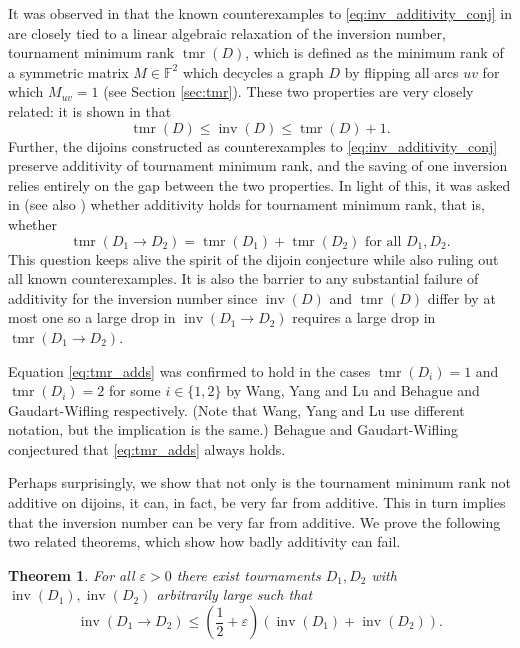 \documentclass[10pt,a4paper]{amsart}
\numberwithin{equation}{section}
\theoremstyle{plain}
\newtheorem{thm}{Theorem}[section]
\theoremstyle{remark}
\theoremstyle{definition}
\newcommand{\lb}{\left(}
\newcommand{\rb}{\right)}
\renewcommand{\epsilon}{\varepsilon}
\newcommand{\e}{\epsilon}
\newcommand{\tmr}{\operatorname{tmr}}
\newcommand{\inv}{\operatorname{inv}}
\begin{document}
It was observed in \cite{Natnote} that the known counterexamples to \eqref{eq:inv_additivity_conj} in \cite{Alon,Problems} are closely tied to a linear algebraic relaxation of the inversion number, tournament minimum rank $\tmr(D)$, which is defined as the minimum rank of a symmetric matrix $M \in \mathbb{F}^2$ which decycles a graph $D$ by flipping all arcs $uv$ for which $M_{uv} = 1$ (see Section \ref{sec:tmr}). These two properties are very closely related: it is shown in \cite{Natnote} that
\begin{equation}
    \tmr(D) \leq \inv(D) \leq \tmr(D) + 1.  \label{rel}
\end{equation}
Further, the dijoins constructed as counterexamples to \eqref{eq:inv_additivity_conj}  preserve additivity of tournament minimum rank, and the saving of one inversion relies entirely on the gap between the two properties. In light of this, it was asked in \cite[Question 17]{Natnote} (see also \cite[Problem 30.2]{BCC}) whether additivity holds for tournament minimum rank, that is, whether
\begin{equation}
    \tmr(D_1 \to D_2) = \tmr(D_1) + \tmr(D_2) \text{ for all }D_1,D_2. \label{eq:tmr_adds}
\end{equation}
 This question keeps alive the spirit of the dijoin conjecture while also ruling out all known counterexamples. It is also the barrier to any substantial failure of additivity for the inversion number since $\inv(D)$ and $\tmr(D)$ differ by at most one so a large drop in $\inv(D_1 \to D_2)$ requires a large drop in $\tmr(D_1 \to D_2)$.
 
Equation \eqref{eq:tmr_adds} was confirmed to hold in the cases $\tmr(D_i) = 1$ and  $\tmr(D_i) = 2$  for some $i \in \{1,2\}$ by Wang, Yang and Lu \cite{Wang} and Behague and Gaudart-Wifling \cite{natcase} respectively. (Note that Wang, Yang and Lu \cite{Wang}  use different notation, but the implication is the same.) 
Behague and Gaudart-Wifling \cite[Conjecture 6.1]{natcase} conjectured that \eqref{eq:tmr_adds} always holds.

Perhaps surprisingly, we show that not only is the tournament minimum rank not additive on dijoins, it can, in fact, be very far from additive. This in turn implies that the inversion number can be very far from additive. We prove the following two related theorems, which show how badly additivity can fail.

\begin{thm} \label{T1}
    For all $\e>0$ there exist tournaments $D_1, D_2$ with $\inv(D_1),\inv(D_2)$ arbitrarily large such that
    \begin{equation*}
        \inv(D_1 \to D_2) \leq \lb\frac{1}{2} +\e\rb(\inv(D_1)+\inv(D_2)).
    \end{equation*}
\end{thm}
\end{document}
